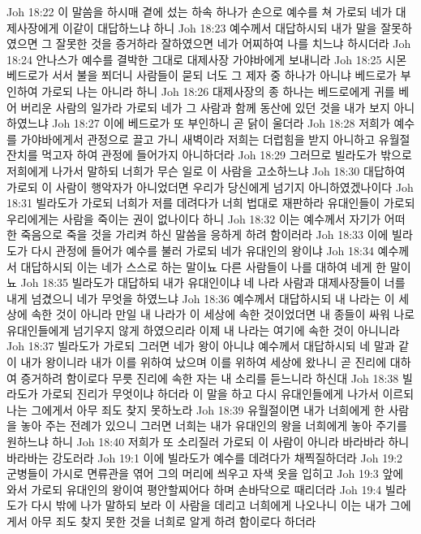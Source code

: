 Joh 18:22  이 말씀을 하시매 곁에 섰는 하속 하나가 손으로 예수를 쳐 가로되 네가 대제사장에게 이같이 대답하느냐 하니
Joh 18:23  예수께서 대답하시되 내가 말을 잘못하였으면 그 잘못한 것을 증거하라 잘하였으면 네가 어찌하여 나를 치느냐 하시더라
Joh 18:24  안나스가 예수를 결박한 그대로 대제사장 가야바에게 보내니라
Joh 18:25  시몬 베드로가 서서 불을 쬐더니 사람들이 묻되 너도 그 제자 중 하나가 아니냐 베드로가 부인하여 가로되 나는 아니라 하니
Joh 18:26  대제사장의 종 하나는 베드로에게 귀를 베어 버리운 사람의 일가라 가로되 네가 그 사람과 함께 동산에 있던 것을 내가 보지 아니하였느냐
Joh 18:27  이에 베드로가 또 부인하니 곧 닭이 울더라
Joh 18:28  저희가 예수를 가야바에게서 관정으로 끌고 가니 새벽이라 저희는 더럽힘을 받지 아니하고 유월절 잔치를 먹고자 하여 관정에 들어가지 아니하더라
Joh 18:29  그러므로 빌라도가 밖으로 저희에게 나가서 말하되 너희가 무슨 일로 이 사람을 고소하느냐
Joh 18:30  대답하여 가로되 이 사람이 행악자가 아니었더면 우리가 당신에게 넘기지 아니하였겠나이다
Joh 18:31  빌라도가 가로되 너희가 저를 데려다가 너희 법대로 재판하라 유대인들이 가로되 우리에게는 사람을 죽이는 권이 없나이다 하니
Joh 18:32  이는 예수께서 자기가 어떠한 죽음으로 죽을 것을 가리켜 하신 말씀을 응하게 하려 함이러라
Joh 18:33  이에 빌라도가 다시 관정에 들어가 예수를 불러 가로되 네가 유대인의 왕이냐
Joh 18:34  예수께서 대답하시되 이는 네가 스스로 하는 말이뇨 다른 사람들이 나를 대하여 네게 한 말이뇨
Joh 18:35  빌라도가 대답하되 내가 유대인이냐 네 나라 사람과 대제사장들이 너를 내게 넘겼으니 네가 무엇을 하였느냐
Joh 18:36  예수께서 대답하시되 내 나라는 이 세상에 속한 것이 아니라 만일 내 나라가 이 세상에 속한 것이었더면 내 종들이 싸워 나로 유대인들에게 넘기우지 않게 하였으리라 이제 내 나라는 여기에 속한 것이 아니니라
Joh 18:37  빌라도가 가로되 그러면 네가 왕이 아니냐 예수께서 대답하시되 네 말과 같이 내가 왕이니라 내가 이를 위하여 났으며 이를 위하여 세상에 왔나니 곧 진리에 대하여 증거하려 함이로다 무릇 진리에 속한 자는 내 소리를 듣느니라 하신대
Joh 18:38  빌라도가 가로되 진리가 무엇이냐 하더라 이 말을 하고 다시 유대인들에게 나가서 이르되 나는 그에게서 아무 죄도 찾지 못하노라
Joh 18:39  유월절이면 내가 너희에게 한 사람을 놓아 주는 전례가 있으니 그러면 너희는 내가 유대인의 왕을 너희에게 놓아 주기를 원하느냐 하니
Joh 18:40  저희가 또 소리질러 가로되 이 사람이 아니라 바라바라 하니 바라바는 강도러라
Joh 19:1  이에 빌라도가 예수를 데려다가 채찍질하더라
Joh 19:2  군병들이 가시로 면류관을 엮어 그의 머리에 씌우고 자색 옷을 입히고
Joh 19:3  앞에 와서 가로되 유대인의 왕이여 평안할찌어다 하며 손바닥으로 때리더라
Joh 19:4  빌라도가 다시 밖에 나가 말하되 보라 이 사람을 데리고 너희에게 나오나니 이는 내가 그에게서 아무 죄도 찾지 못한 것을 너희로 알게 하려 함이로다 하더라
